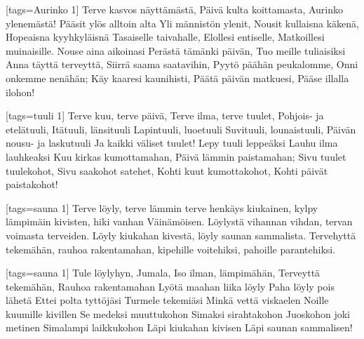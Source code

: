 
[tags={Aurinko 1}]
  \beginverse
    Terve kasvos näyttämästä,
    Päivä kulta koittamasta,
    Aurinko ylenemästä!
    Pääsit ylös alltoin alta
    Yli männistön ylenit,
    Nousit kullaisna käkenä,
    Hopeaisna kyyhkyläisnä
    Tasaiselle taivahalle,
    Elollesi entiselle,
    Matkoillesi muinaisille.
  \endverse
  \beginverse
    Nouse aina aikoinasi
    Perästä tämänki päivän,
    Tuo meille tuliaisiksi
    Anna täyttä terveyttä,
    Siirrä saama saatavihin,
    Pyytö päähän peukalomme,
    Onni onkemme nenähän;
    Käy kaaresi kaunihisti,
    Päätä päivän matkuesi,
    Pääse illalla ilohon!
  \endverse
\endsong


[tags={tuuli 1}]
  \beginverse
    Terve kuu, terve päivä,
    Terve ilma, terve tuulet,
    Pohjois- ja etelätuuli,
    Itätuuli, länsituuli
    Lapintuuli, luoetuuli
    Suvituuli, lounaistuuli,
    Päivän nousu- ja laskutuuli
    Ja kaikki väliset tuulet!
    Lepy tuuli leppeäksi
    Lauhu ilma lauhkeaksi
    Kuu kirkas kumottamahan,
    Päivä lämmin paistamahan;
    Sivu tuulet tuulekohot,
    Sivu saakohot satehet,
    Kohti kuut kumottakohot,
    Kohti päivät paistakohot!
  \endverse
\endsong


[tags={sauna 1}]
  \beginverse
    Terve löyly, terve lämmin
    terve henkäys kiukainen,
    kylpy lämpimäin kivisten,
    hiki vanhan Väinämöisen.
    Löylystä vihannan vihdan,
    tervan voimasta terveiden.
  \endverse
  \beginverse
    Löyly kiukahan kivestä,
    löyly saunan sammalista.
    Tervehyttä tekemähän,
    rauhoa rakentamahan,
    kipehille voitehiksi,
    pahoille parantehiksi.  
  \endverse 
\endsong


[tags={sauna 1}]
  \beginverse
    Tule löylyhyn, Jumala, 
    Iso ilman, lämpimähän,
    Terveyttä tekemähän,
    Rauhoa rakentamahan
  \endverse
  \beginverse
    Lyötä maahan liika löyly
    Paha löyly pois lähetä
    Ettei polta tyttöjäsi
    Turmele tekemiäsi
  \endverse
  \beginverse
    Minkä vettä viskaelen
    Noille kuumille kivillen
    Se medeksi muuttukohon
    Simaksi sirahtakohon
  \endverse
  \beginverse
    Juoskohon joki metinen
    Simalampi laikkukohon
    Läpi kiukahan kivisen
    Läpi saunan sammalisen! 
  \endverse 
\endsong


